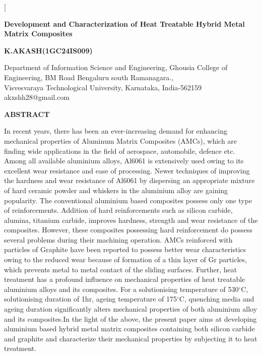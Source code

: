 \documentclass[10pt,a4paper]{article}
\numberwithin{figure}{section}
\numberwithin{table}{section}
\begin{document}
\twocolumn[
\begin{@twocolumnfalse}
\noindent
{\Large \textbf{Development and Characterization of Heat Treatable Hybrid Metal Matrix Composites}}

\vspace{0.2cm}

\noindent
{\normalsize  \textbf{ K.AKASH(1GC24IS009)}}

\vspace{0.2cm}

\noindent
{\footnotesize
Department of Information Science and Engineering, Ghousia College of Engineering, BM Road Bengaluru south Ramanagara.,\\
Visvesvaraya Technological University, Karnataka, India-562159\\
akxshh28@gmail.com
}

\vspace{0.3cm}

\hline

\vspace{0.3cm}

\noindent
{\normalsize \textbf{ABSTRACT}}

\vspace{0.1cm}

\justify
\footnotesize
 In recent years, there has been an ever-increasing demand for enhancing mechanical properties of Aluminum Matrix Composites (AMCs), which are finding wide applications in the field of aerospace, automobile, defence etc. Among all available aluminium alloys, Al6061 is extensively used owing to its excellent wear resistance and ease of processing. Newer techniques of improving the hardness and wear resistance of Al6061 by dispersing an appropriate mixture of hard ceramic powder and whiskers in the aluminium alloy are gaining popularity. The conventional aluminium based composites possess only one type of reinforcements. Addition of hard reinforcements such as silicon carbide, alumina, titanium carbide, improves hardness, strength and wear resistance of the composites. However, these composites possessing hard reinforcement do possess several problems during their machining operation. AMCs reinforced with particles of Graphite have been reported to possess better wear characteristics owing to the reduced wear because of formation of a thin layer of Gr particles, which prevents metal to metal contact of the sliding surfaces. Further, heat treatment has a profound influence on mechanical properties of heat treatable aluminium alloys and its composites. For a solutionising temperature of 530$^\circ$C, solutionising duration of 1hr, ageing temperature of 175$^\circ$C, quenching media and ageing duration significantly alters mechanical properties of both aluminium alloy and its composites.In the light of the above, the present paper aims at developing aluminium based hybrid metal matrix composites containing both silicon carbide and graphite and characterize their mechanical properties by subjecting it to heat treatment.


\end{@twocolumnfalse}
\end{document}
